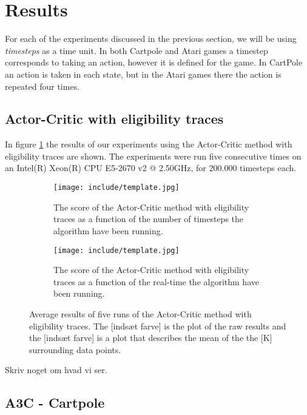 \documentclass[11pt]{article}
\begin{document}
\section{Results}

For each of the experiments discussed in the previous section,
we will be using \textit{timesteps} as a time unit.
In both Cartpole and Atari games a timestep corresponds to
taking an action, however it is defined for the game.
In CartPole an action is taken in each state, but in the Atari games
there the action is repeated four times.

\subsection{Actor-Critic with eligibility traces}

In figure \ref{fig:cp_et} the results of our experiments using the Actor-Critic method with eligibility
traces are shown.
The experiments were run five consecutive times on an Intel(R) Xeon(R) CPU E5-2670 v2 @ 2.50GHz\cite{intel}, for $200.000$ timesteps each.


\begin{figure}[H]
    \begin{subfigure}{.5\textwidth}
        \centering
        \texttt{[image: include/template.jpg]}
        \caption{The score of the Actor-Critic method with eligibility
            traces as a function of the number of timesteps
            the algorithm have been running.}
    \end{subfigure}
    \begin{subfigure}{.5\textwidth}
        \centering
        \texttt{[image: include/template.jpg]}
        \caption{The score of the Actor-Critic method with eligibility
            traces as a function of the real-time the algorithm
            have been running.}
    \end{subfigure}
    \caption{Average results of five runs of the Actor-Critic method
        with eligibility traces. The [indsæt farve] is the plot of the
        raw results and the [indsæt farve] is a plot that describes the
        mean of the the [K] surrounding data points.} 
     \label{fig:cp_et}
\end{figure}

Skriv noget om hvad vi ser.

\subsection{A3C - Cartpole}
\end{document}
